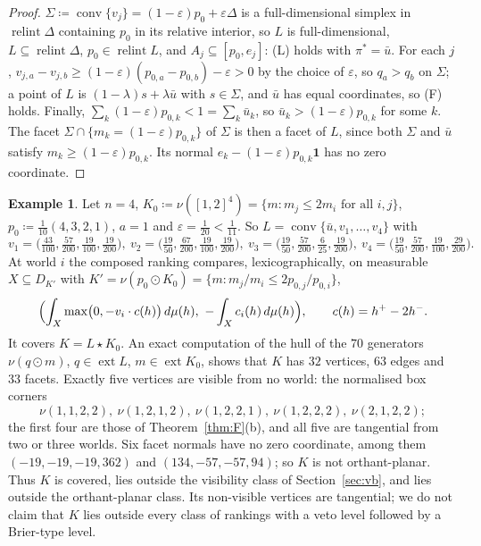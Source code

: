 \documentclass[11pt]{article}
\newcommand{\one}{\mathbf{1}}
\newcommand{\ub}{\bar u}
\DeclareMathOperator{\conv}{conv}
\DeclareMathOperator{\relint}{relint}
\DeclareMathOperator{\ext}{ext}
\theoremstyle{plain}
\theoremstyle{definition}
\newtheorem{example}[theorem]{Example}
\theoremstyle{remark}
\begin{document}
\begin{proof}
$\Sigma\coloneqq\conv\{v_j\}=(1-\varepsilon)p_0+\varepsilon\Delta$ is a full-dimensional
simplex in $\relint\Delta$ containing $p_0$ in its relative interior, so $L$ is
full-dimensional, $L\subseteq\relint\Delta$, $p_0\in\relint L$, and $A_j\subseteq[p_0,
e_j]$: (L) holds with $\pi^\ast=\ub$. For each $j$, $v_{j,a}-v_{j,b}\ge(1-\varepsilon)
(p_{0,a}-p_{0,b})-\varepsilon>0$ by the choice of $\varepsilon$, so $q_a>q_b$ on $\Sigma$;
a point of $L$ is $(1-\lambda)s+\lambda\ub$ with $s\in\Sigma$, and $\ub$ has equal
coordinates, so (F) holds. Finally, $\sum_k(1-\varepsilon)p_{0,k}<1=\sum_k\ub_k$, so
$\ub_k>(1-\varepsilon)p_{0,k}$ for some $k$. The facet $\Sigma\cap\{m_k=(1-\varepsilon)
p_{0,k}\}$ of $\Sigma$ is then a facet of $L$, since both $\Sigma$ and $\ub$ satisfy
$m_k\ge(1-\varepsilon)p_{0,k}$. Its normal $e_k-(1-\varepsilon)p_{0,k}\one$ has no zero
coordinate.
\end{proof}

\begin{example}\label{ex:n4}
Let $n=4$, $K_0\coloneqq\nu([1,2]^4)=\{m:m_j\le2m_i\text{ for all }i,j\}$, $p_0\coloneqq
\frac1{10}(4,3,2,1)$, $a=1$ and $\varepsilon=\frac1{20}<\frac1{11}$. So $L=\conv\{\ub,
v_1,\dots,v_4\}$ with
\[
  v_1=\bigl(\tfrac{43}{100},\tfrac{57}{200},\tfrac{19}{100},\tfrac{19}{200}\bigr),\
  v_2=\bigl(\tfrac{19}{50},\tfrac{67}{200},\tfrac{19}{100},\tfrac{19}{200}\bigr),\
  v_3=\bigl(\tfrac{19}{50},\tfrac{57}{200},\tfrac{6}{25},\tfrac{19}{200}\bigr),\
  v_4=\bigl(\tfrac{19}{50},\tfrac{57}{200},\tfrac{19}{100},\tfrac{29}{200}\bigr).
\]
At world $i$ the composed ranking compares, lexicographically, on measurable
$X\subseteq D_{K'}$ with $K'=\nu(p_0\odot K_0)=\{m:m_j/m_i\le2p_{0,j}/p_{0,i}\}$,
\[
  \Bigl(\int_X\max\bigl(0,-v_i\cdot c(h)\bigr)\,d\mu(h),\ -\int_Xc_i(h)\,d\mu(h)\Bigr),
  \qquad c(h)=h^+-2h^- .
\]
It covers $K=L\star K_0$. An exact computation of the hull of the $70$ generators
$\nu(q\odot m)$, $q\in\ext L$, $m\in\ext K_0$, shows that $K$ has $32$ vertices, $63$
edges and $33$ facets. Exactly five vertices are visible from no world: the normalised box
corners
\[
  \nu(1,1,2,2),\ \nu(1,2,1,2),\ \nu(1,2,2,1),\ \nu(1,2,2,2),\ \nu(2,1,2,2);
\]
the first four are those of Theorem~\ref{thm:F}(b), and all five are tangential from two
or three worlds. Six facet normals have no zero coordinate, among them
$(-19,-19,-19,362)$ and $(134,-57,-57,94)$; so $K$ is not orthant-planar. Thus $K$ is
covered, lies outside the visibility class of Section~\ref{sec:vb}, and lies outside the
orthant-planar class. Its non-visible vertices are tangential; we do not claim that $K$
lies outside every class of rankings with a veto level followed by a Brier-type level.
\end{example}
\end{document}
